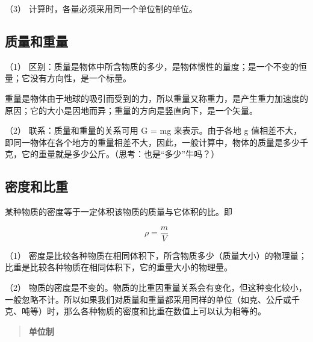 （3） 计算时，各量必须采用同一个单位制的单位。

\subsection{质量和重量}\label{ux8d28ux91cfux548cux91cdux91cf-1}

（1）
区别：质量是物体中所含物质的多少，是物体惯性的量度；是一个不变的恒量；它没有方向性，是一个标量。

重量是物体由于地球的吸引而受到的力，所以重量又称重力，是产生重力加速度的原因；它的大小是因地而异；重量的方向是竖直向下，是一个矢量。

（2） 联系：质量和重量的关系可用 G = mg 来表示。由于各地 g
值相差不大，即同一物体在各个地方的重量相差不大，因此，一般计算中，物体的质量是多少千克，它的重量就是多少公斤。（思考：也是``多少''牛吗？）

\subsection{密度和比重}\label{ux5bc6ux5ea6ux548cux6bd4ux91cd-1}

某种物质的密度等于一定体积该物质的质量与它体积的比。即

\[
\rho = \frac {m}{V}
\]

（1）
密度是比较各种物质在相同体积下，所含物质多少（质量大小）的物理量；比重是比较各种物质在相同体积下，它的重量大小的物理量。

（2）
物质的密度是不变的。物质的比重因重量关系会有变化，但这种变化较小，一般忽略不计。所以如果我们对质量和重量都采用同样的单位（如克、公斤或千克、吨等）时，那么各种物质的密度和比重在数值上可以认为相等的。

\begin{quote}
\textbf{单位制}
\end{quote}


